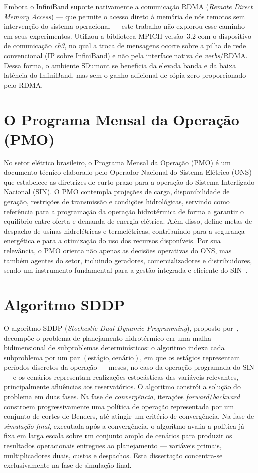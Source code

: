 Embora o InfiniBand suporte nativamente a comunicação RDMA
(\textit{Remote Direct Memory Access}) --- que permite o acesso direto à
memória de nós remotos sem intervenção do sistema operacional --- este
trabalho não explorou esse caminho em seus experimentos. Utilizou a
biblioteca MPICH versão~3.2 com o dispositivo de comunicação \textit{ch3},
no qual a troca de mensagens ocorre sobre a pilha de rede convencional
(IP sobre InfiniBand) e não pela interface nativa de \textit{verbs}/RDMA.
Dessa forma, o ambiente SDumont se beneficia da elevada banda e da baixa
latência do InfiniBand, mas sem o ganho adicional de cópia zero
proporcionado pelo RDMA.

\section{O Programa Mensal da Operação (PMO)}
No setor elétrico brasileiro, o Programa Mensal da Operação (PMO) é um
documento técnico elaborado pelo Operador Nacional do Sistema Elétrico
(ONS) que estabelece as diretrizes de curto prazo para a operação do
Sistema Interligado Nacional (SIN). O PMO contempla projeções de carga,
disponibilidade de geração, restrições de transmissão e condições
hidrológicas, servindo como referência para a programação da operação
hidrotérmica de forma a garantir o equilíbrio entre oferta e demanda de
energia elétrica. Além disso, define metas de despacho de usinas
hidrelétricas e termelétricas, contribuindo para a segurança energética e
para a otimização do uso dos recursos disponíveis. Por sua relevância, o
PMO orienta não apenas as decisões operativas do ONS, mas também agentes
do setor, incluindo geradores, comercializadores e distribuidores, sendo
um instrumento fundamental para a gestão integrada e eficiente do
SIN~\cite{ons:23}.

\section{Algoritmo SDDP}
\label{sec:algoritmo_sddp}
O algoritmo SDDP (\textit{Stochastic Dual Dynamic Programming}),
proposto por~\cite{MvLm:91}, decompõe o problema de planejamento
hidrotérmico em uma malha bidimensional de subproblemas
determinísticos: o algoritmo indexa cada subproblema por um par
$(\text{estágio}, \text{cenário})$, em que os estágios representam
períodos discretos da operação --- meses, no caso da operação
programada do SIN --- e os cenários representam realizações
estocásticas das variáveis relevantes, principalmente afluências aos
reservatórios. O algoritmo constrói a solução do problema em duas fases. Na fase de
\textit{convergência}, iterações \textit{forward}/\textit{backward}
constroem progressivamente uma política de operação representada por
um conjunto de cortes de Benders, até atingir um critério de
convergência. Na fase de \textit{simulação final}, executada após a
convergência, o algoritmo avalia a política já fixa em larga escala sobre um
conjunto amplo de cenários para produzir os resultados operacionais
entregues ao planejamento --- variáveis primais, multiplicadores duais,
custos e despachos. Esta dissertação concentra-se exclusivamente na
fase de simulação final.

